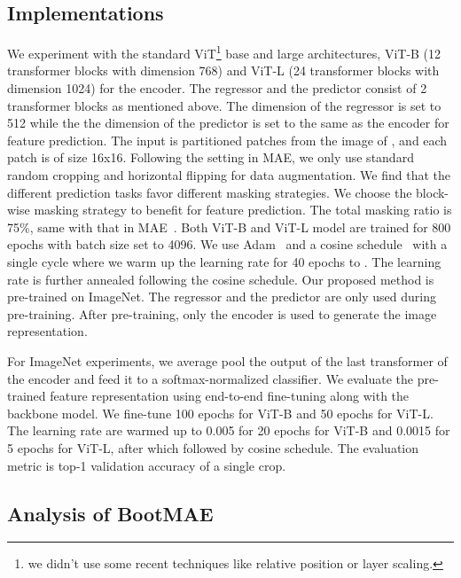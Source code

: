 \documentclass[runningheads]{llncs}
\begin{document}
\subsection{Implementations}
\vspace{-1mm}
We experiment with the standard ViT\footnote{we didn't use some recent techniques like relative position or layer scaling.} base and large architectures,
ViT-B (12 transformer blocks with dimension 768) and ViT-L (24 transformer blocks with dimension 1024) for the encoder. 
The regressor and the predictor consist of 2 transformer blocks as mentioned above. The dimension of the regressor is set to 512 while the the dimension of the predictor is set to the same as the encoder for feature prediction.
The input is partitioned  patches from the image of , and each patch is of size 16x16. Following the setting in MAE, we only use
standard random cropping and horizontal flipping for data augmentation.
We find that the different prediction tasks favor different masking strategies. We choose the block-wise masking strategy to benefit for feature prediction.
The total masking ratio is 75\%, same with that in MAE~\cite{he2021masked}.
Both ViT-B and ViT-L model are trained for 800 epochs with batch size set to 4096.
We use Adam~\cite{kingma2014adam} and a cosine schedule~\cite{loshchilov2016sgdr} with a single cycle where
we warm up the learning rate for 40 epochs to . The learning rate is further annealed following the cosine schedule. 
Our proposed method is pre-trained on ImageNet. The regressor and the predictor are only used during pre-training. After pre-training, only the encoder is used to generate the image representation.

For ImageNet experiments, we average pool the output of the last transformer of the encoder and feed it to a softmax-normalized classifier.
We evaluate the pre-trained feature representation using end-to-end fine-tuning along with the backbone model. We fine-tune 100 epochs for ViT-B and 50 epochs for ViT-L.
The learning rate are warmed up to 0.005 for 20 epochs for ViT-B and 0.0015 for 5 epochs for ViT-L, after which followed by cosine schedule. The evaluation metric is top-1 validation accuracy of a single  crop.

\vspace{-1mm}\subsection{Analysis of BootMAE}
\vspace{-1mm}
\end{document}
